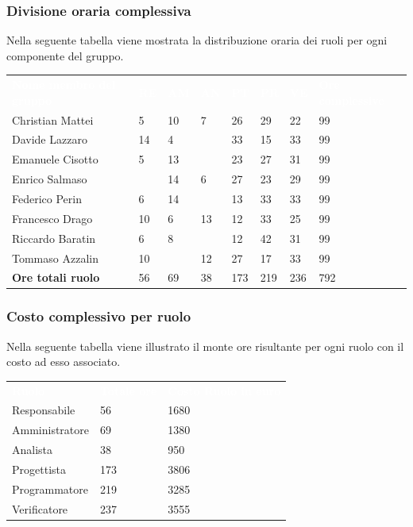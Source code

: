 \subsubsection{Divisione oraria complessiva} 
Nella seguente tabella viene mostrata la distribuzione oraria dei ruoli per ogni componente del gruppo.\\
{
	\renewcommand{\arraystretch}{2}
	\centering
	\begin{longtable}{ C{5cm} C{1cm} C{1cm} C{1cm} C{1cm} C{1cm} C{1cm} C{3cm}}
		\textcolor{white}{\textbf{Nome membro del gruppo}} & \textcolor{white}{\textbf{RE}} & \textcolor{white}{\textbf{AM}} & \textcolor{white}{\textbf{AN}} & \textcolor{white}{\textbf{PT}} & \textcolor{white}{\textbf{PR}} & \textcolor{white}{\textbf{VE}} & \textcolor{white}{\textbf{Ore complessive}}\\	
        
        Christian Mattei & 5 & 10 & 7 & 26 & 29 & 22 & 99 \\
        Davide Lazzaro & 14 & 4 & & 33 & 15 & 33 & 99\\
        Emanuele Cisotto & 5 & 13 & & 23 & 27 & 31 & 99 \\
        Enrico Salmaso & & 14 & 6 & 27 & 23 & 29 & 99\\
        Federico Perin & 6 & 14 & & 13 & 33 & 33 & 99\\
        Francesco Drago & 10 & 6 & 13 & 12 & 33 & 25 & 99 \\
        Riccardo Baratin & 6 & 8 & & 12 & 42 & 31 & 99 \\
        Tommaso Azzalin & 10 & & 12 & 27 & 17 & 33 & 99 \\
        \textbf{Ore totali ruolo} & 56 & 69 & 38 & 173 & 219 & 236 &  792 \\

	\end{longtable}
}
\subsubsection{Costo complessivo per ruolo}
Nella seguente tabella viene illustrato il monte ore risultante per ogni ruolo con il costo ad esso associato.\\
{
	\renewcommand{\arraystretch}{2}
	\centering
	\begin{longtable}{ C{3cm} C{2cm} C{4cm}}
		\textcolor{white}{\textbf{Ruolo}} & \textcolor{white}{\textbf{Totale ore}} & \textcolor{white}{\textbf{Costo Ruolo in euro}}\\	
        
        Responsabile & 56 &  1680\\
        Amministratore & 69 & 1380 \\
        Analista & 38 & 950 \\
        Progettista & 173 & 3806 \\
        Programmatore & 219 & 3285 \\
        Verificatore & 237 & 3555 \\
		
	\end{longtable}
}

